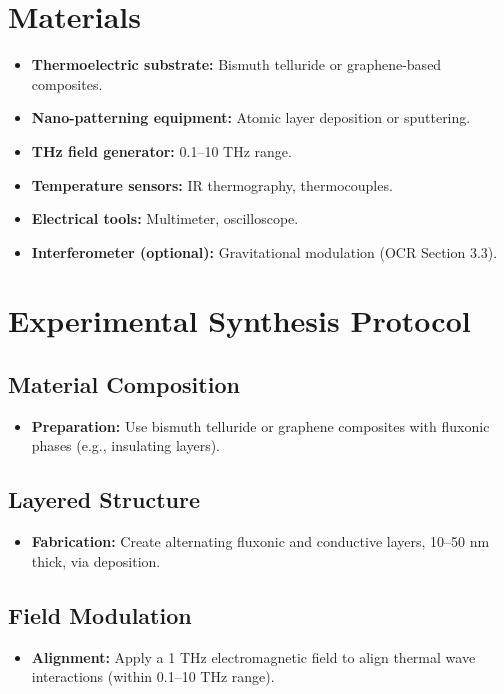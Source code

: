 \documentclass[a4paper,12pt]{article}
\begin{document}
\section{Materials}
\begin{itemize}
    \item \textbf{Thermoelectric substrate:} Bismuth telluride or graphene-based composites.
    \item \textbf{Nano-patterning equipment:} Atomic layer deposition or sputtering.
    \item \textbf{THz field generator:} 0.1--10 THz range.
    \item \textbf{Temperature sensors:} IR thermography, thermocouples.
    \item \textbf{Electrical tools:} Multimeter, oscilloscope.
    \item \textbf{Interferometer (optional):} Gravitational modulation (OCR Section 3.3).
\end{itemize}

\section{Experimental Synthesis Protocol}
\subsection{Material Composition}
\begin{itemize}
    \item \textbf{Preparation:} Use bismuth telluride or graphene composites with fluxonic phases (e.g., insulating layers).
\end{itemize}

\subsection{Layered Structure}
\begin{itemize}
    \item \textbf{Fabrication:} Create alternating fluxonic and conductive layers, 10--50 nm thick, via deposition.
\end{itemize}

\subsection{Field Modulation}
\begin{itemize}
    \item \textbf{Alignment:} Apply a 1 THz electromagnetic field to align thermal wave interactions (within 0.1--10 THz range).
\end{itemize}
\end{document}

